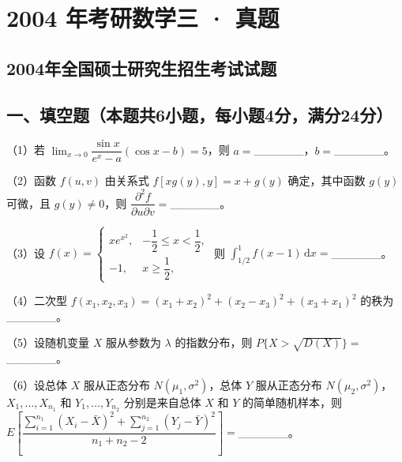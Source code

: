 \documentclass[UTF8,12pt]{ctexart}
\begin{document}
\section*{2004 年考研数学三 · 真题}
\subsection*{2004年全国硕士研究生招生考试试题}

\subsection*{一、填空题（本题共6小题，每小题4分，满分24分）}

（1）若 \(\displaystyle \lim_{x\to0}\dfrac{\displaystyle \sin x}{\displaystyle e^x-a}(\cos x-b)=5\)，则 \(\displaystyle a=\)\_\_\_\_\_\_，\(\displaystyle b=\)\_\_\_\_\_\_。


（2）函数 \(\displaystyle f(u,\allowbreak v)\) 由关系式 \(\displaystyle f[xg(y),\allowbreak y]=x+g(y)\) 确定，其中函数 \(\displaystyle g(y)\) 可微，且 \(\displaystyle g(y)\ne0\)，则 \(\displaystyle \dfrac{\displaystyle \partial^2f}{\displaystyle \partial u\partial v}=\)\_\_\_\_\_\_。


（3）设 \(\displaystyle f(x)=\begin{cases}xe^{x^2},\allowbreak &-\dfrac{\displaystyle 1}{\displaystyle 2}\le x<\dfrac{\displaystyle 1}{\displaystyle 2},\allowbreak \\-1,\allowbreak &x\ge\dfrac{\displaystyle 1}{\displaystyle 2},\allowbreak \end{cases}\) 则 \(\displaystyle \int_{1/2}^{1}f(x-1)\,\mathrm dx=\)\_\_\_\_\_\_。


（4）二次型 \(\displaystyle f(x_1,\allowbreak x_2,\allowbreak x_3)=(x_1+x_2)^2+(x_2-x_3)^2+(x_3+x_1)^2\) 的秩为\_\_\_\_\_\_。


（5）设随机变量 \(\displaystyle X\) 服从参数为 \(\displaystyle \lambda\) 的指数分布，则 \(\displaystyle P\{X>\sqrt{D(X)}\}=\)\_\_\_\_\_\_。


（6）设总体 \(\displaystyle X\) 服从正态分布 \(\displaystyle N(\mu_1,\allowbreak \sigma^2)\)，总体 \(\displaystyle Y\) 服从正态分布 \(\displaystyle N(\mu_2,\allowbreak \sigma^2)\)，\(\displaystyle X_1,\allowbreak \ldots,\allowbreak X_{n_1}\) 和 \(\displaystyle Y_1,\allowbreak \ldots,\allowbreak Y_{n_2}\) 分别是来自总体 \(\displaystyle X\) 和 \(\displaystyle Y\) 的简单随机样本，则 \(\displaystyle E\left[\dfrac{\displaystyle \sum_{i=1}^{n_1}(X_i-\bar X)^2+\displaystyle \sum_{j=1}^{n_2}(Y_j-\bar Y)^2}{\displaystyle n_1+n_2-2}\right]=\)\_\_\_\_\_\_。
\end{document}
